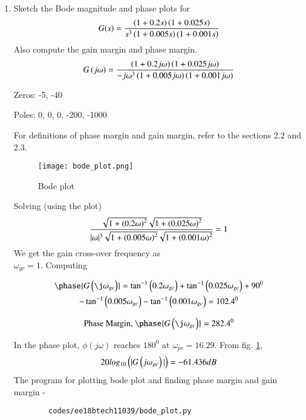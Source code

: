 \begin{enumerate}[label=\thesubsection.\arabic*.,ref=\thesubsection.\theenumi]
    
    \item Sketch the Bode magnitude and phase plots for 
    \begin{align}
        G(s) = \frac{\left(1+0.2s\right)\left(1+0.025s\right)}{s^3\left(1+0.005s\right)\left(1+0.001s\right)}
    \end{align}
    Also compute the gain margin and phase margin.\\
    \solution
    \begin{align}
        G\left(j\omega\right) = \frac{\left(1+0.2j\omega\right)\left(1+0.025j\omega\right)}{-j\omega^3\left(1+0.005j\omega\right)\left(1+0.001j\omega\right)}
    \end{align}
    
    Zeros: -5, -40
    
    Poles: 0, 0, 0, -200, -1000
    
    For definitions of phase margin and gain margin, refer to the sections 2.2 and 2.3.
    
    \begin{figure}[!h]
    \centering
      \texttt{[image: bode\_plot.png]}
      \caption{Bode plot}
      \label{fig:ee18btech11039}
    \end{figure}
    
    Solving (using the plot)
    \begin{align}
        \frac{\sqrt{1+\left(0.2\omega\right)^2} \sqrt{1+\left(0.025\omega\right)^2}}{|\omega|^3 \sqrt{1+\left(0.005\omega\right)^2} \sqrt{1+\left(0.001\omega\right)^2}} = 1
    \end{align}
    We get the gain cross-over frequency as \\ $\omega _{gc} = 1$. 
    Computing 
    
        \begin{multline}
            \phase{G\brak{\j\omega_{gc}}} = \tan^{-1}\brak{0.2\omega_{gc}}+\tan^{-1}\brak{0.025\omega_{gc}}+90^0\\
            -\tan^{-1}\brak{0.005\omega_{gc}}-\tan^{-1}\brak{0.001\omega_{gc}}
            = 102.4^0
        \end{multline}
    
    \begin{align}
    \text{Phase Margin, } \phase{G\brak{\j\omega_{gc}}} = 282.4^0
    \end{align}
    
    In the phase plot, $\phi(j\omega)$ reaches $180^0$ at $\omega_{pc} = 16.29$. From fig. \ref{fig:ee18btech11039}, 
    \begin{align}
        20log_{10}\left(|G\left(j\omega_{pc}\right)|\right) = -61.436 dB
    \end{align}
    The program for plotting bode plot and finding phase margin and gain margin -
    \begin{lstlisting}
        codes/ee18btech11039/bode_plot.py
    \end{lstlisting}
    
    \end{enumerate}
    
    